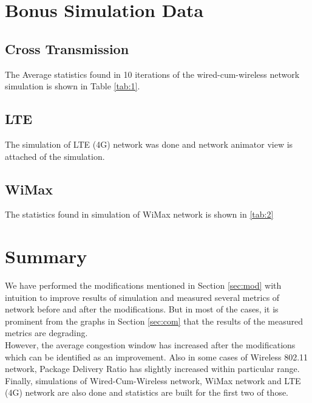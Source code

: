 \documentclass{article}[12pt]
\begin{document}
\newpage
\section{Bonus Simulation Data}

    \subsection{Cross Transmission}
        The Average statistics found in 10 iterations of the wired-cum-wireless network simulation is shown in Table \ref{tab:1}. \\
        
    
    \subsection{LTE}
        The simulation of LTE (4G) network was done and network animator view is attached of the simulation. 
        
    \newpage
    \subsection{WiMax}
        The statistics found in simulation of WiMax network is shown in \ref{tab:2} \\
        

\section{Summary}
    We have performed the modifications mentioned in Section \ref{sec:mod} with intuition to improve results of simulation and measured several metrics of network before and after the modifications. But in most of the cases, it is prominent from the graphs in Section \ref{sec:com} that the results of the measured metrics are degrading. \\
    However, the average congestion window has increased after the modifications which can be identified as an improvement. Also in some cases of Wireless 802.11 network, Package Delivery Ratio has slightly increased within particular range. \\
    Finally, simulations of Wired-Cum-Wireless network, WiMax network and  LTE (4G) network are also done and statistics are built for the first two of those.
    
\end{document}
